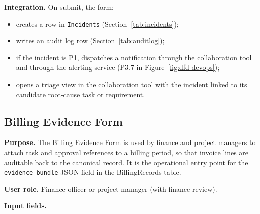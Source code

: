 \documentclass[12pt,a4paper]{report}
\begin{document}
\textbf{Integration.} On submit, the form:
\begin{itemize}[leftmargin=1.6em]
    \item creates a row in \texttt{Incidents} (Section~\ref{tab:incidents});
    \item writes an audit log row (Section~\ref{tab:auditlog});
    \item if the incident is P1, dispatches a notification through the
          collaboration tool and through the alerting service (P3.7 in
          Figure~\ref{fig:dfd-devops});
    \item opens a triage view in the collaboration tool with the incident
          linked to its candidate root-cause task or requirement.
\end{itemize}

\subsection{Billing Evidence Form}
\label{sec:form-billing}

\textbf{Purpose.} The Billing Evidence Form is used by finance and project
managers to attach task and approval references to a billing period, so
that invoice lines are auditable back to the canonical record. It is the
operational entry point for the \texttt{evidence\_bundle} JSON field in the
BillingRecords table.

\textbf{User role.} Finance officer or project manager (with finance
review).

\textbf{Input fields.}
\end{document}

